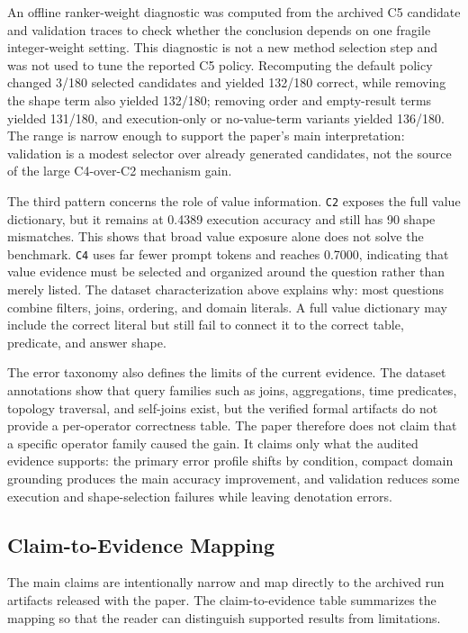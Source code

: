 \documentclass{ieeeaccess}
\begin{document}
An offline ranker-weight diagnostic was computed from the archived C5 candidate and validation traces to check whether the conclusion depends on one fragile integer-weight setting. This diagnostic is not a new method selection step and was not used to tune the reported C5 policy. Recomputing the default policy changed 3/180 selected candidates and yielded 132/180 correct, while removing the shape term also yielded 132/180; removing order and empty-result terms yielded 131/180, and execution-only or no-value-term variants yielded 136/180. The range is narrow enough to support the paper's main interpretation: validation is a modest selector over already generated candidates, not the source of the large C4-over-C2 mechanism gain.

The third pattern concerns the role of value information. \texttt{C2} exposes the full value dictionary, but it remains at 0.4389 execution accuracy and still has 90 shape mismatches. This shows that broad value exposure alone does not solve the benchmark. \texttt{C4} uses far fewer prompt tokens and reaches 0.7000, indicating that value evidence must be selected and organized around the question rather than merely listed. The dataset characterization above explains why: most questions combine filters, joins, ordering, and domain literals. A full value dictionary may include the correct literal but still fail to connect it to the correct table, predicate, and answer shape.

The error taxonomy also defines the limits of the current evidence. The dataset annotations show that query families such as joins, aggregations, time predicates, topology traversal, and self-joins exist, but the verified formal artifacts do not provide a per-operator correctness table. The paper therefore does not claim that a specific operator family caused the gain. It claims only what the audited evidence supports: the primary error profile shifts by condition, compact domain grounding produces the main accuracy improvement, and validation reduces some execution and shape-selection failures while leaving denotation errors.

\subsection{Claim-to-Evidence Mapping}\label{claim-to-evidence-mapping}

The main claims are intentionally narrow and map directly to the archived run artifacts released with the paper. The claim-to-evidence table summarizes the mapping so that the reader can distinguish supported results from limitations.
\end{document}
